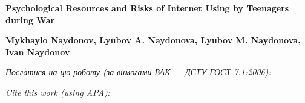 \documentclass[a4paper,14pt,article]{memoir}
\newcommand{\articleTitleUkr}{
	Psychological Resources and Risks of Internet Using by Teenagers during War}
\renewcommand{\authorFullNameUkr}{Mykhaylo Naydonov, Lyubov A. Naydonova, Lyubov M. Naydonova, Ivan Naydonov}
\begin{document}
	
	\begin{center}
		\par\textbf{\MakeUppercase\articleTitleUkr}
		\par\textbf{\authorFullNameUkr}
	\end{center}
	
	\par\bigskip\textit{Послатися на цю роботу (за вимогами ВАК --- ДСТУ ГОСТ 7.1:2006):}
	\par{}
	\par\bigskip\textit{Cite this work (using APA):}
	\par{}
	
	
\end{document}
